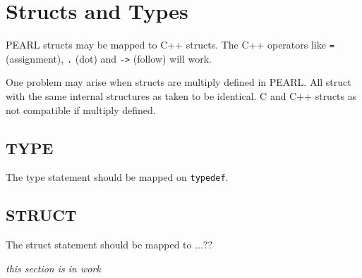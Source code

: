 \chapter{Structs and Types}

PEARL structs may be mapped to C++ structs.
The C++ operators like \verb|=| (assignment), \verb|.| (dot) and 
\verb|->| (follow) will work.

One problem may arise when structs are multiply defined
in PEARL. All struct with the same internal structures as
taken to be identical. C and C++ structs as not compatible
if multiply defined.

\section{TYPE}
The type statement should be mapped on \verb|typedef|.

\section{STRUCT}
The struct statement should be mapped to ...??

{\em this section is in work}
